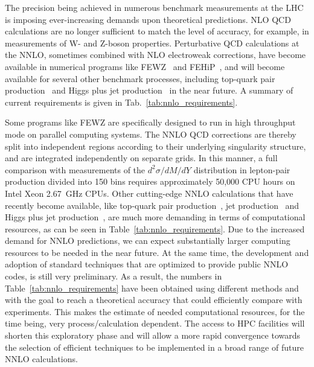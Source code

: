 \documentclass[12pt]{article}
\newcommand{\registered}{\textsuperscript{\textregistered}\xspace}
\begin{document}
The precision being achieved in numerous benchmark measurements at the
LHC is imposing ever-increasing demands upon theoretical predictions.
NLO QCD calculations are no longer sufficient to match the level of
accuracy, for example, in measurements of W- and Z-boson properties.
Perturbative QCD calculations at the NNLO, sometimes combined with NLO
electroweak corrections, have become available in numerical programs
like FEWZ~\cite{Melnikov:2006kv,Li:2012wna} and
FEHiP~\cite{Anastasiou:2005qj}, and will become available for several
other benchmark processes, including top-quark pair
production~\cite{Baernreuther:2012ws,Czakon:2013goa} and Higgs plus
jet production~\cite{Boughezal:2013uia} in the near future. A summary 
of current requirements is given in Tab.~\ref{tab:nnlo_requirements}.

Some programs like FEWZ are specifically designed to run in high
throughput mode on parallel computing systems. The NNLO QCD
corrections are thereby split into independent regions according to
their underlying singularity structure, and are integrated
independently on separate grids.  In this manner, a full comparison
with measurements of the $d^2 \sigma/dM/dY$ distribution in
lepton-pair production divided into 150 bins requires approximately
50,000 CPU hours on Intel\registered Xeon\registered 2.67~GHz CPUs.
Other cutting-edge NNLO calculations that have recently become
available, like top-quark pair
production~\cite{Baernreuther:2012ws,Czakon:2013goa},
jet production~\cite{Ridder:2013mf} and Higgs plus
jet production~\cite{Boughezal:2013uia}, are much more demanding in
terms of computational resources, as can be seen in
Table~\ref{tab:nnlo_requirements}. Due to the increased demand for
NNLO predictions, we can expect substantially larger computing
resources to be needed in the near future. At the same time, the
development and adoption of standard techniques that
are optimized to provide public NNLO codes, is still very
preliminary. As a result, the numbers in
Table~\ref{tab:nnlo_requirements} have been obtained using different
methods and with the goal to reach a theoretical accuracy that
could efficiently compare with experiments. This makes the estimate
of needed computational resources, for the time being, very
process/calculation dependent. The access to HPC facilities will
shorten this exploratory phase and will allow a more rapid
convergence towards the selection of efficient techniques 
to be implemented in a broad range of future NNLO calculations.
\end{document}
